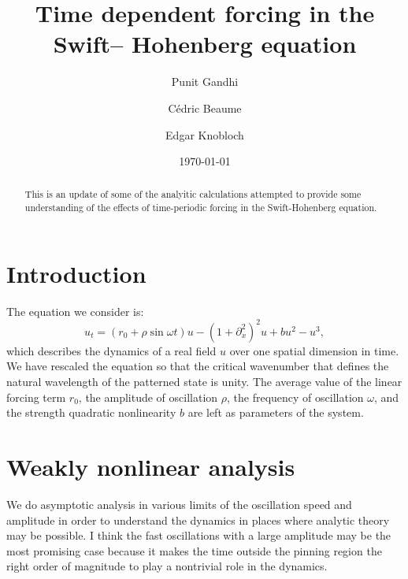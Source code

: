 \documentclass[pre,preprint,superscriptaddress]{revtex4-1}
\begin{document}
\title{Time dependent forcing in the Swift-- Hohenberg equation}
\author{Punit Gandhi}
\author{C\'edric Beaume}
\author{Edgar Knobloch}
\date{\today}

\begin{abstract}
This is an update of some of the analyitic calculations attempted to provide some understanding of the effects of time-periodic forcing in the Swift-Hohenberg equation. 
\end{abstract}

\maketitle

\section{Introduction}
The equation we consider is: 
\begin{equation}
u_t= (r_0+ \rho \sin\omega t) u-\left(1+\partial_{x}^2\right)^2u+b u^2-u^3\label{eq:SHtd},
\end{equation}
which describes the dynamics of a real field $u$ over one spatial dimension in time.  We have rescaled the equation so that the critical wavenumber that defines the natural wavelength of the patterned state is unity.   The average value of the linear forcing term $r_0$, the amplitude of oscillation $\rho$, the frequency of oscillation $\omega$, and the strength quadratic nonlinearity $b$ are left as parameters of the system.



\section{Weakly nonlinear analysis}
We do asymptotic analysis in various limits of the oscillation speed and amplitude in order to understand the dynamics in places where analytic theory may be possible.  I think the fast oscillations with a large amplitude may be the most promising case because it makes the time outside the pinning region the right order of magnitude to play a nontrivial role in the dynamics.
\end{document}
